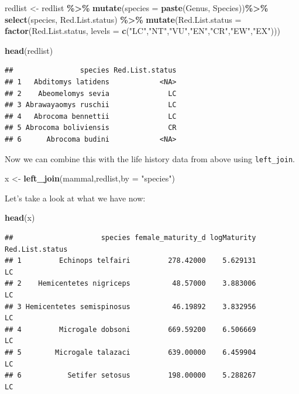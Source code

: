 \documentclass[
  a4paperpaper,
]{book}
\newenvironment{Shaded}{\begin{snugshade}}{\end{snugshade}}
\newcommand{\DataTypeTok}[1]{\textcolor[rgb]{0.13,0.29,0.53}{#1}}
\newcommand{\KeywordTok}[1]{\textcolor[rgb]{0.13,0.29,0.53}{\textbf{#1}}}
\newcommand{\NormalTok}[1]{#1}
\newcommand{\OperatorTok}[1]{\textcolor[rgb]{0.81,0.36,0.00}{\textbf{#1}}}
\newcommand{\StringTok}[1]{\textcolor[rgb]{0.31,0.60,0.02}{#1}}
\begin{document}
\begin{Shaded}
\begin{Highlighting}[]
\NormalTok{redlist \textless{}{-}}\StringTok{ }\NormalTok{redlist }\OperatorTok{\%\textgreater{}\%}
\StringTok{  }\KeywordTok{mutate}\NormalTok{(}\DataTypeTok{species =} \KeywordTok{paste}\NormalTok{(Genus, Species))}\OperatorTok{\%\textgreater{}\%}
\StringTok{  }\KeywordTok{select}\NormalTok{(species, Red.List.status) }\OperatorTok{\%\textgreater{}\%}
\StringTok{  }\KeywordTok{mutate}\NormalTok{(}\DataTypeTok{Red.List.status =} \KeywordTok{factor}\NormalTok{(Red.List.status, }
                                  \DataTypeTok{levels =} \KeywordTok{c}\NormalTok{(}\StringTok{"LC"}\NormalTok{,}\StringTok{"NT"}\NormalTok{,}\StringTok{"VU"}\NormalTok{,}\StringTok{"EN"}\NormalTok{,}\StringTok{"CR"}\NormalTok{,}\StringTok{"EW"}\NormalTok{,}\StringTok{"EX"}\NormalTok{)))}

\KeywordTok{head}\NormalTok{(redlist)}
\end{Highlighting}
\end{Shaded}

\begin{verbatim}
##                species Red.List.status
## 1   Abditomys latidens            <NA>
## 2    Abeomelomys sevia              LC
## 3 Abrawayaomys ruschii              LC
## 4   Abrocoma bennettii              LC
## 5 Abrocoma boliviensis              CR
## 6      Abrocoma budini            <NA>
\end{verbatim}

Now we can combine this with the life history data from above using \texttt{left\_join}.

\begin{Shaded}
\begin{Highlighting}[]
\NormalTok{x \textless{}{-}}\StringTok{ }\KeywordTok{left\_join}\NormalTok{(mammal,redlist,}\DataTypeTok{by =} \StringTok{"species"}\NormalTok{)}
\end{Highlighting}
\end{Shaded}

Let's take a look at what we have now:

\begin{Shaded}
\begin{Highlighting}[]
\KeywordTok{head}\NormalTok{(x)}
\end{Highlighting}
\end{Shaded}

\begin{verbatim}
##                     species female_maturity_d logMaturity Red.List.status
## 1         Echinops telfairi         278.42000    5.629131              LC
## 2    Hemicentetes nigriceps          48.57000    3.883006              LC
## 3 Hemicentetes semispinosus          46.19892    3.832956              LC
## 4         Microgale dobsoni         669.59200    6.506669              LC
## 5        Microgale talazaci         639.00000    6.459904              LC
## 6           Setifer setosus         198.00000    5.288267              LC
\end{verbatim}
\end{document}
